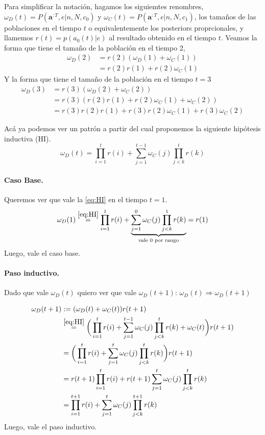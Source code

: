 \documentclass[a4paper,10pt]{article}
\begin{document}

Para simplificar la notación, hagamos los siguiemtes renombres, $\omega_D(t) = P(\bm{a}^{:T},e|n,N, c_0)$ y $\omega_C(t) = P(\bm{a}^{:T},e|n,N, c_1)$, los tamaños de las poblaciones en el tiempo $t$ o equivalentemente los posteriors proprcionales, y llamemos $r(t) =p(a_0(t)|e) $ al resultado obtenido en el tiempo $t$.
Veamos la forma que tiene el tamaño de la población en el tiempo 2,
\begin{align}
\omega_D(2) & = r(2) ( \omega_D(1) + \omega_C(1) ) \\
& = r(2)r(1) + r(2)\omega_C(1)
\end{align}
Y la forma que tiene el tamaño de la población en el tiempo $t=3$
\begin{align}
\omega_D(3) & = r(3) (\omega_D(2)+\omega_C(2)) \\
& = r(3) (r(2)r(1) + r(2)\omega_C(1) + \omega_C(2) ) \\
& = r(3)r(2)r(1) + r(3)r(2)\omega_C(1) + r(3)\omega_C(2) 
\end{align}

Acá ya podemos ver un patrón a partir del cual proponemos la siguiente hipótesis inductiva (HI).
\begin{equation} \label{eq:HI} \tag{HI} 
\omega_D(t) = \prod^t_{i=1} r(i) + \sum^{t-1}_{j=1} \omega_C(j)
\prod^t_{j<k} r(k)
\end{equation}

\paragraph{Caso Base.} Queremos ver que vale la \ref{eq:HI} en el tiempo $t=1$.
\begin{equation} 
\omega_D(1) \overset{\ref{eq:HI}}{=} \prod^1_{i=1} r(i) + \underbrace{\sum^{0}_{j=1} \omega_C(j) \prod^1_{j<k} r(k) }_{\text{vale $0$ por rango}} = r(1)
\end{equation}
Luego, vale el caso base.

\paragraph{Paso inductivo.} Dado que vale $\omega_D(t)$ quiero ver que vale $\omega_D(t+1)$: $\omega_D(t) \Rightarrow \omega_D(t+1)$

\begin{equation}
\begin{split}
\omega_D(t+1) &:= (\omega_D(t) + \omega_C(t)) r(t+1)  \\
& \overset{\ref{eq:HI}}{=} \bigg( \prod^t_{i=1} r(i) + \sum^{t-1}_{j=1} \omega_C(j) \prod^t_{j<k} r(k) + \omega_C(t) \bigg) r(t+1) \\
& = \bigg( \prod^t_{i=1} r(i) + \sum^{t}_{j=1} \omega_C(j) \prod^t_{j<k} r(k)\bigg) r(t+1) \\
& = r(t+1) \prod^t_{i=1} r(i) + r(t+1) \sum^{t}_{j=1}  \omega_C(j) \prod^t_{j<k} r(k) \\ 
& = \prod^{t+1}_{i=1} r(i) + \sum^{t}_{j=1}  \omega_C(j) \prod^{t+1}_{j<k} r(k) \\
\end{split}
\end{equation}
Luego, vale el paso inductivo. \\
\end{document}
